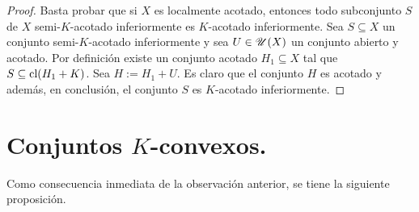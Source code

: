 \begin{proof}
Basta probar que si $X$ es localmente acotado, entonces
todo subconjunto $S$ de $X$ semi-$K$-acotado 
inferiormente es $K$-acotado inferiormente.
Sea $S\subseteq X$ un conjunto semi-$K$-acotado 
inferiormente y sea $U\in\mathscr{U}(X)$ un conjunto 
abierto y acotado. Por definición existe un conjunto
acotado $H_1\subseteq X$ tal que $S\subseteq \mathop{\hbox{\rm cl}}\nolimits(H_1+K)$.
Sea $H:= H_1+U$. Es claro que el conjunto $H$ es acotado
y además,
en conclusión, el conjunto $S$ es $K$-acotado inferiormente.
\end{proof}

\section{Conjuntos $K$-convexos.}
\setcounter{theorem}{0}
Como consecuencia inmediata de la observación anterior,
se tiene la siguiente proposición.

